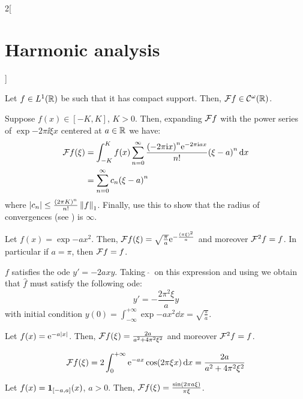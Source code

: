 \documentclass[../../../main_math.tex]{subfiles}
\begin{document}
\begin{multicols}{2}[\section{Harmonic analysis}]
  \begin{proposition}
    Let $f\in L^1(\mathbb{R})$ be such that it has compact support. Then, $\mathcal{F} f\in\mathcal{C}^\omega(\mathbb{R})$.
  \end{proposition}
  \begin{sproof}
    Suppose $f(x)\in[-K,K]$, $K>0$. Then, expanding $\mathcal{F} f$ with the power series of $\exp{-2\pi\ii\xi x}$ centered at $a\in\mathbb{R}$ we have:
    \begin{align*}
      \mathcal{F} f(\xi) & =\int_{-K}^Kf(x)\sum_{n=0}^{\infty}\frac{{(-2\pi\mathrm{i} x)}^n\mathrm{e}^{-2\pi\mathrm{i} a x}}{n!}{(\xi-a)}^n\dd{x} \\
                & =\sum_{n=0}^\infty c_n{(\xi-a)}^n
    \end{align*}
    where $\abs{c_n}\leq\frac{{(2\pi K)}^n}{n!}\left\|f\right\|_1$. Finally, use this to show that the radius of convergences (see ) is $\infty$.
  \end{sproof}
  \begin{lemma}\label{HA:expX2}
    Let $f(x)=\exp{-a x^2}$. Then, $\mathcal{F} f(\xi)=\sqrt{\frac{\pi}{a}}\mathrm{e}^{-\frac{{(\pi \xi)}^2}{a}}$ and moreover $\mathcal{F}^2f=f$. In particular if $a=\pi$, then $\mathcal{F} f=f$.
  \end{lemma}
  \begin{sproof}
    $f$ satisfies the ode $y'=-2a x y$. Taking $\ \widehat{}\ $ on this expression and using  we obtain that $\widehat{f}$ must satisfy the following ode:
    $$y'=-\frac{2\pi^2\xi}{a} y$$
    with initial condition $y(0)=\int_{-\infty}^{+\infty}\exp{-a x^2}\dd{x}=\sqrt{\frac{\pi}{a}}$.
  \end{sproof}
  \begin{lemma}\label{HA:expAbsX}
    Let $f(x)=\mathrm{e}^{-a\abs{x}}$. Then, $\mathcal{F} f(\xi)=\frac{2a}{a^2+4\pi^2\xi^2}$ and moreover $\mathcal{F}^2f=f$.
  \end{lemma}
  \begin{sproof}
    $$\mathcal{F} f(\xi)=2\int_0^{+\infty}\mathrm{e}^{-ax}\cos(2\pi\xi x)\dd{x}=\frac{2a}{a^2+4\pi^2\xi^2}$$
  \end{sproof}
  \begin{lemma}
    Let $f(x)=\boldsymbol{\mathrm{1}}_{[-a,a]}(x)$, $a>0$. Then, $\mathcal{F} f(\xi)=\frac{\sin(2\pi a\xi)}{\pi\xi}$.
  \end{lemma}

\end{multicols}
\end{document}
